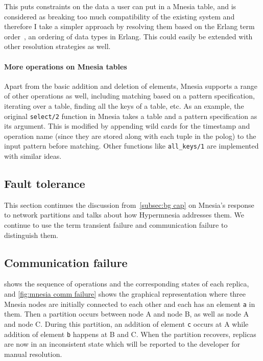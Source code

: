 This puts constraints on the data a user can put in a Mnesia table, and
is considered as breaking too much compatibility of the existing system and therefore
I take a simpler approach by resolving them based on the Erlang term 
order~\cite{ericssonab2023refmanual}, an ordering of data types in Erlang.
This could easily be extended with other resolution strategies as well.


\paragraph{More operations on Mnesia tables}

Apart from the basic addition and deletion of elements, Mnesia 
supports a range of other operations as well, including
matching based on a pattern specification, iterating over a table, finding all
the keys of a table, etc. As an example, the original \verb|select/2| function
in Mnesia takes a table and a pattern specification as its argument. This is
modified by appending wild cards for the timestamp and operation name (since they
are stored along with each tuple in the \acrshort{polog}) to the input pattern 
before matching. Other functions like \verb|all_keys/1| are implemented with
similar ideas.


\subsection{Fault tolerance} \label{sec:impl fault tolerance}

This section continues the discussion from~\cref{subsec:bg cap} on Mnesia's response
to network partitions and talks about how Hypermnesia addresses them. We continue
to use the term transient failure and communication failure to distinguish them.

\subsection{Communication failure} \label{subsec:impl communication failure}

 shows the sequence of
operations and the corresponding states of each replica, and
\cref{fig:mnesia comm failure} shows the graphical representation where three
Mnesia nodes are initially connected to each other and each has an element
\texttt{a} in them. Then a partition occurs between node A and node B, as well as
node A and node C. During this partition, an addition of 
element \texttt{c} occurs at A while addition of element \texttt{b} happens
at B and C. When the partition recovers, replicas are now in an inconsistent
state which will be reported to the developer for manual resolution.


